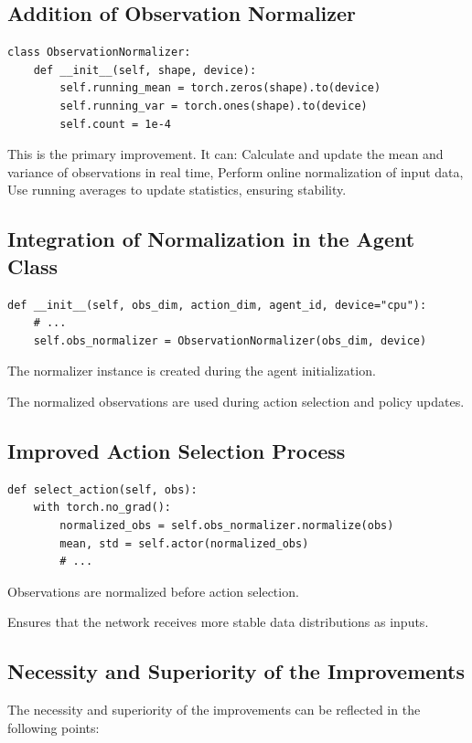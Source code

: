 \documentclass[12pt]{article}
\begin{document}
\subsection{Addition of Observation Normalizer}
\begin{verbatim}
class ObservationNormalizer:
    def __init__(self, shape, device):
        self.running_mean = torch.zeros(shape).to(device)
        self.running_var = torch.ones(shape).to(device)
        self.count = 1e-4
\end{verbatim}

This is the primary improvement. It can: Calculate and update the mean and variance of observations in real time, Perform online normalization of input data, Use running averages to update statistics, ensuring stability.

\subsection{Integration of Normalization in the Agent Class}
\begin{verbatim}
def __init__(self, obs_dim, action_dim, agent_id, device="cpu"):
    # ...
    self.obs_normalizer = ObservationNormalizer(obs_dim, device)
\end{verbatim}

The normalizer instance is created during the agent initialization.

The normalized observations are used during action selection and policy updates.

\subsection{Improved Action Selection Process}
\begin{verbatim}
def select_action(self, obs):
    with torch.no_grad():
        normalized_obs = self.obs_normalizer.normalize(obs)
        mean, std = self.actor(normalized_obs)
        # ...
\end{verbatim}

Observations are normalized before action selection.

Ensures that the network receives more stable data distributions as inputs.

\subsection{Necessity and Superiority of the Improvements}

The necessity and superiority of the improvements can be reflected in the following points:
\end{document}
